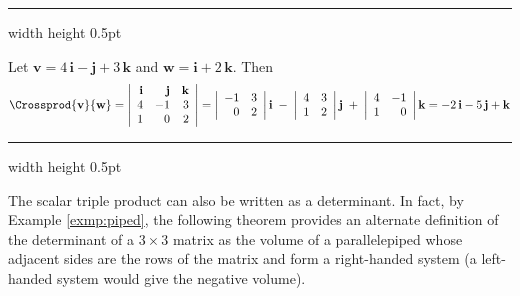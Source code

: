 \vspace{2mm}
\hrule width \textwidth height 0.5pt
\begin{exmp}
 Let $\textbf{v} = 4\,\textbf{i} - \textbf{j} + 3\,\textbf{k}$ and $\textbf{w} = \textbf{i} + 2\,\textbf{k}$. Then
 \begin{displaymath}
  \Crossprod{\textbf{v}}{\textbf{w}} =
  \left|
  \begin{array}{rrr}
   \textbf{i} & \textbf{j} & \textbf{k}\\
   4 & -1 & 3\\
   1 & 0 & 2
  \end{array}\right|
  = \left|\begin{array}{rr} -1 & 3 \\ 0 & 2 \end{array}\right| \textbf{i} \;-\;
  \left|\begin{array}{rr} 4 & 3 \\ 1 & 2 \end{array}\right| \textbf{j} \;+\;
  \left|\begin{array}{rr} 4 & -1 \\ 1 & 0 \end{array}\right| \textbf{k}
  = -2\,\textbf{i} - 5\,\textbf{j} + \textbf{k}
 \end{displaymath}
\end{exmp}
\hrule width \textwidth height 0.5pt
\vspace{2mm}

The scalar triple product can also be written as a determinant. In fact, by Example \ref{exmp:piped}, the following
theorem provides an alternate definition of the determinant of a $3 \times 3$ matrix as the volume
of a parallelepiped whose adjacent sides are the rows of the matrix and form a right-handed system (a
left-handed system would give the negative volume).


